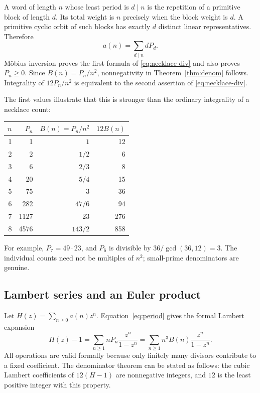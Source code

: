 \documentclass[11pt,a4paper]{article}
\numberwithin{equation}{section}
\theoremstyle{definition}
\theoremstyle{remark}
\begin{document}
A word of length $n$ whose least period is $d\mid n$ is the repetition of
a primitive block of length $d$. Its total weight is $n$ precisely when the
block weight is $d$. A primitive cyclic orbit of such blocks has exactly
$d$ distinct linear representatives. Therefore
\begin{equation}\label{eq:period}
 a(n)=\sum_{d\mid n}dP_d.
\end{equation}
M\"obius inversion proves the first formula of \eqref{eq:necklace-div} and
also proves $P_n\ge0$. Since $B(n)=P_n/n^2$, nonnegativity in
Theorem~\ref{thm:denom} follows. Integrality of $12P_n/n^2$ is equivalent
to the second assertion of \eqref{eq:necklace-div}.

The first values illustrate that this is stronger than the ordinary
integrality of a necklace count:
\begin{center}
\begin{tabular}{r r r r}
\toprule
$n$ & $P_n$ & $B(n)=P_n/n^2$ & $12B(n)$\\
\midrule
1&1&$1$&12\\
2&2&$1/2$&6\\
3&6&$2/3$&8\\
4&20&$5/4$&15\\
5&75&$3$&36\\
6&282&$47/6$&94\\
7&1127&$23$&276\\
8&4576&$143/2$&858\\
\bottomrule
\end{tabular}
\end{center}
For example, $P_7=49\cdot23$, and $P_6$ is divisible by
$36/\gcd(36,12)=3$. The individual counts need not be multiples of $n^2$;
small-prime denominators are genuine.

\subsection{Lambert series and an Euler product}
Let $H(z)=\sum_{n\ge0}a(n)z^n$. Equation~\eqref{eq:period} gives the formal
Lambert expansion
\begin{equation}\label{eq:Lambert}
 H(z)-1=\sum_{n\ge1}nP_n\frac{z^n}{1-z^n}
       =\sum_{n\ge1}n^3B(n)\frac{z^n}{1-z^n}.
\end{equation}
All operations are valid formally because only finitely many divisors
contribute to a fixed coefficient. The denominator theorem can be stated
as follows: the cubic Lambert coefficients of $12(H-1)$ are nonnegative
integers, and $12$ is the least positive integer with this property.
\end{document}
